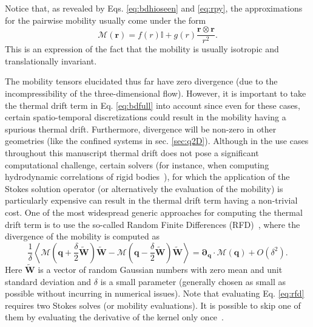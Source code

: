 \documentclass[ twoside,openright,titlepage,numbers=noenddot,%
headinclude,footinclude,cleardoublepage=empty,abstract=on,
BCOR=5mm,paper=b5,fontsize=11pt, dvipsnames
]{scrreprt}
\renewcommand{\vec}[1]{\bm{#1}}
\newcommand{\tens}[1]{\bm{\mathcal{#1}}}
\newcommand{\noise}{\widetilde{W}}
\newcommand{\ppos}{q}
\begin{document}
Notice that, as revealed by Eqs. \eqref{eq:bdhioseen} and \eqref{eq:rpy}, the approximations for the pairwise mobility usually come under the form
\begin{equation}
  \label{eq:bdhimobgeneral}
  \tens{M}(\vec{r}) = f(r)\mathbb{I} + g(r)\frac{\vec{r}\otimes\vec{r}}{r^2}.
\end{equation}
This is an expression of the fact that the mobility is usually isotropic and translationally invariant.

The mobility tensors elucidated thus far have zero divergence (due to the incompressibility of the three-dimensional flow). However, it is important to take the thermal drift term in Eq. \eqref{eq:bdfull} into account since even for these cases, certain spatio-temporal discretizations could result in the mobility having a spurious thermal drift. Furthermore, divergence will be non-zero in other geometries (like the confined systems in sec. \ref{sec:q2D}).
Although in the use cases throughout this manuscript thermal drift does not pose a significant computational challenge, certain solvers (for instance, when computing hydrodynamic correlations of rigid bodies~\cite{Westwood2021}), for which the application of the Stokes solution operator (or alternatively the evaluation of the mobility) is particularly expensive can result in the thermal drift term having a non-trivial cost.
One of the most widespread generic approaches for computing the thermal drift term is to use the so-called Random Finite Differences (RFD)~\cite{Delong2014}, where the divergence of the mobility is computed as
\begin{equation}
  \label{eq:rfd}
    \frac{1}{\delta}\left\langle \tens{M}\left(\vec{\ppos}+\frac{\delta}{2}\vec{\noise}\right)\vec{\noise} - \tens{M}\left(\vec{\ppos}-\frac{\delta}{2}\vec{\noise}\right)\vec{\noise}\right\rangle
    = \vec{\partial}_{\vec{\ppos}}\cdot\tens{M}(\vec{\ppos}) + O(\delta^2).
\end{equation}
Here $\vec{\noise}$ is a vector of random Gaussian numbers with zero mean and unit standard deviation and $\delta$ is a small parameter (generally chosen as small as possible without incurring in numerical issues).
Note that evaluating Eq. \eqref{eq:rfd} requires two Stokes solves (or mobility evaluations). It is possible to skip one of them by evaluating the derivative of the kernel only once~\cite{Delong2014}.
\end{document}
